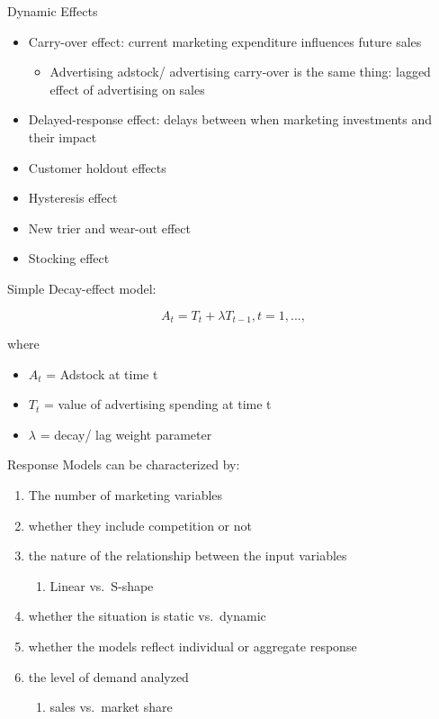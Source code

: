\documentclass[
]{book}
\providecommand{\tightlist}{%
  \setlength{\itemsep}{0pt}\setlength{\parskip}{0pt}}
\begin{document}
Dynamic Effects

\begin{itemize}
\item
  Carry-over effect: current marketing expenditure influences future sales

  \begin{itemize}
  \tightlist
  \item
    Advertising adstock/ advertising carry-over is the same thing: lagged effect of advertising on sales
  \end{itemize}
\item
  Delayed-response effect: delays between when marketing investments and their impact
\item
  Customer holdout effects
\item
  Hysteresis effect
\item
  New trier and wear-out effect
\item
  Stocking effect
\end{itemize}

Simple Decay-effect model:

\[
A_t = T_t + \lambda T_{t-1}, t = 1,...,
\]

where

\begin{itemize}
\tightlist
\item
  \(A_t\) = Adstock at time t
\item
  \(T_t\) = value of advertising spending at time t
\item
  \(\lambda\) = decay/ lag weight parameter
\end{itemize}

Response Models can be characterized by:

\begin{enumerate}
\def\labelenumi{\arabic{enumi}.}
\item
  The number of marketing variables
\item
  whether they include competition or not
\item
  the nature of the relationship between the input variables

  \begin{enumerate}
  \def\labelenumii{\arabic{enumii}.}
  \tightlist
  \item
    Linear vs.~S-shape
  \end{enumerate}
\item
  whether the situation is static vs.~dynamic
\item
  whether the models reflect individual or aggregate response
\item
  the level of demand analyzed

  \begin{enumerate}
  \def\labelenumii{\arabic{enumii}.}
  \tightlist
  \item
    sales vs.~market share
  \end{enumerate}
\end{enumerate}
\end{document}
